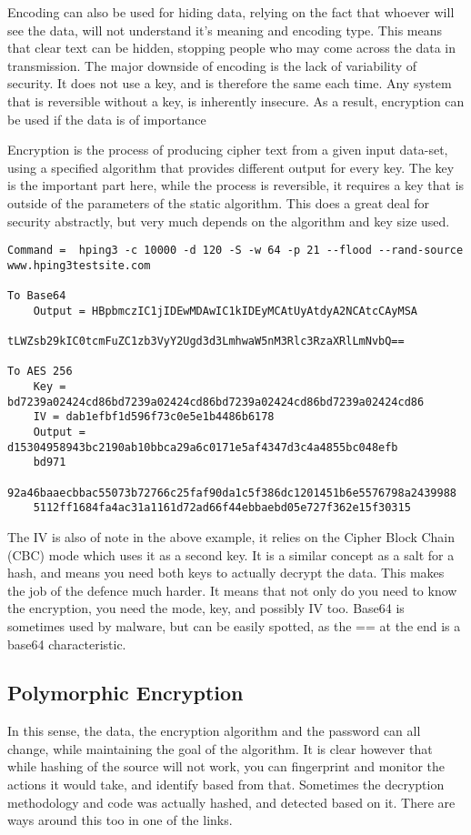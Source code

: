 Encoding can also be used for hiding data, relying on the fact that whoever will see the data, will not understand it's meaning and encoding type.
This means that clear text can be hidden, stopping people who may come across the data in transmission. The major downside of encoding is the lack of variability of security.
It does not use a key, and is therefore the same each time. Any system that is reversible without a key, is inherently insecure. As a result, encryption can be used if the data is of importance

Encryption is the process of producing cipher text from a given input data-set, using a specified algorithm that provides different output for every key. The key is the important part here,
while the process is reversible, it requires a key that is outside of the parameters of the static algorithm. This does a great deal for security abstractly, but very much depends on the algorithm and key size used.

\begin{lstlisting}[label=EncodingVsEncryption,caption=Encoding vs Encryption]
Command =  hping3 -c 10000 -d 120 -S -w 64 -p 21 --flood --rand-source www.hping3testsite.com

To Base64
    Output = HBpbmczIC1jIDEwMDAwIC1kIDEyMCAtUyAtdyA2NCAtcCAyMSA
             tLWZsb29kIC0tcmFuZC1zb3VyY2Ugd3d3LmhwaW5nM3Rlc3RzaXRlLmNvbQ==

To AES 256
    Key = bd7239a02424cd86bd7239a02424cd86bd7239a02424cd86bd7239a02424cd86
    IV = dab1efbf1d596f73c0e5e1b4486b6178
    Output = d15304958943bc2190ab10bbca29a6c0171e5af4347d3c4a4855bc048efb
    bd971
    92a46baaecbbac55073b72766c25faf90da1c5f386dc1201451b6e5576798a2439988
    5112ff1684fa4ac31a1161d72ad66f44ebbaebd05e727f362e15f30315

\end{lstlisting}


The IV is also of note in the above example, it relies on the Cipher Block Chain (CBC) mode which uses it as a second key. It is a similar concept as a salt for a hash, and means you need both keys to actually decrypt the data.
This makes the job of the defence much harder. It means that not only do you need to know the encryption, you need the mode, key, and possibly IV too. Base64 is sometimes used by malware, but can be easily spotted, as the ==
 at the end is a base64 characteristic.

\subsection{Polymorphic Encryption}
In this sense, the data, the encryption algorithm and the password can all change, while maintaining the goal of the algorithm.
It is clear however that while hashing of the source will not work, you can fingerprint and monitor the actions it would take, and identify based from that.
Sometimes the decryption methodology and code was actually hashed, and detected based on it. There are ways around this too in one of the links.

